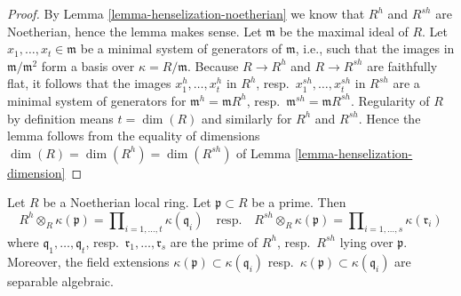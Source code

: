\begin{proof}
By
Lemma \ref{lemma-henselization-noetherian}
we know that $R^h$ and $R^{sh}$ are Noetherian, hence the lemma makes
sense. Let $\mathfrak m$ be the maximal ideal of $R$.
Let $x_1, \ldots, x_t \in \mathfrak m$ be a minimal system of
generators of $\mathfrak m$, i.e., such that the images in
$\mathfrak m/\mathfrak m^2$ form a basis over $\kappa = R/\mathfrak m$.
Because $R \to R^h$ and $R \to R^{sh}$ are faithfully flat, it follows
that the images $x_1^h, \ldots, x_t^h$ in $R^h$,
resp.\  $x_1^{sh}, \ldots, x_t^{sh}$ in $R^{sh}$
are a minimal system of generators for
$\mathfrak m^h = \mathfrak mR^h$,
resp.\ $\mathfrak m^{sh} = \mathfrak mR^{sh}$.
Regularity of $R$ by definition means $t = \dim(R)$ and similarly
for $R^h$ and $R^{sh}$. Hence the lemma follows from the equality
of dimensions $\dim(R) = \dim(R^h) = \dim(R^{sh})$ of
Lemma \ref{lemma-henselization-dimension}
\end{proof}

\begin{lemma}
\label{lemma-fibres-henselization}
Let $R$ be a Noetherian local ring. Let $\mathfrak p \subset R$ be a prime.
Then
$$
R^h \otimes_R \kappa(\mathfrak p) =
\prod\nolimits_{i = 1, \ldots, t} \kappa(\mathfrak q_i)
\quad\text{resp.}\quad
R^{sh} \otimes_R \kappa(\mathfrak p) =
\prod\nolimits_{i = 1, \ldots, s} \kappa(\mathfrak r_i)
$$
where $\mathfrak q_1, \ldots, \mathfrak q_t$,
resp.\ $\mathfrak r_1, \ldots, \mathfrak r_s$
are the prime of $R^h$, resp.\ $R^{sh}$ lying over $\mathfrak p$.
Moreover, the field extensions
$\kappa(\mathfrak p) \subset \kappa(\mathfrak q_i)$
resp.\ $\kappa(\mathfrak p) \subset \kappa(\mathfrak q_i)$
are separable algebraic.
\end{lemma}


